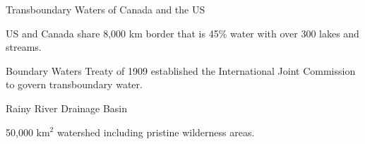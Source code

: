\documentclass[compress,english]{beamer}
\begin{document}
\begin{frame}{Transboundary Waters of Canada and the US}

\begin{center}
\end{center}

US and Canada share 8,000 km border that is 45\% water with over 300 lakes and streams.

Boundary Waters Treaty of 1909 established the International Joint Commission to govern transboundary water.
\end{frame}

\begin{frame}{Rainy River Drainage Basin}

\begin{center}
\end{center}
50,000 km$^2$ watershed including pristine wilderness areas.

\end{frame}
\end{document}
